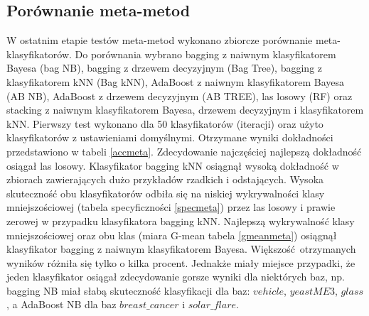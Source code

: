 \subsection{Porównanie meta-metod}
W ostatnim etapie testów meta-metod wykonano zbiorcze porównanie meta-klasyfikatorów. Do porównania wybrano bagging z naiwnym klasyfikatorem Bayesa (bag NB), bagging z drzewem decyzyjnym (Bag Tree), bagging z klasyfikatorem kNN (Bag kNN), AdaBoost z naiwnym klasyfikatorem Bayesa (AB NB), AdaBoost z drzewem decyzyjnym (AB TREE), las losowy (RF) oraz stacking z naiwnym klasyfikatorem Bayesa, drzewem decyzyjnym i klasyfikatorem kNN. Pierwszy test wykonano dla 50 klasyfikatorów (iteracji) oraz użyto klasyfikatorów z ustawieniami domyślnymi. Otrzymane wyniki dokładności przedstawiono w tabeli \ref{accmeta}. Zdecydowanie najczęściej najlepszą dokładność osiągał las losowy. Klasyfikator bagging kNN osiągnął wysoką dokładność w zbiorach zawierających dużo przykładów rzadkich i odstających. Wysoka skuteczność obu klasyfikatorów odbiła się na niskiej wykrywalności klasy mniejszościowej (tabela specyficzności \ref{specmeta}) przez las losowy i prawie zerowej w przypadku klasyfikatora bagging kNN. Najlepszą wykrywalność klasy mniejszościowej oraz obu klas (miara G-mean tabela \ref{gmeanmeta}) osiągnął klasyfikator bagging z naiwnym klasyfikatorem Bayesa. Większość otrzymanych wyników różniła się tylko o kilka procent. Jednakże miały miejsce przypadki, że jeden klasyfikator osiągał zdecydowanie gorsze wyniki dla niektórych baz, np. bagging NB miał słabą skuteczność klasyfikacji dla baz: $vehicle$, $yeastME3$, $glass$, a AdaBoost NB dla baz $breast\_cancer$ i $solar\_flare$.

